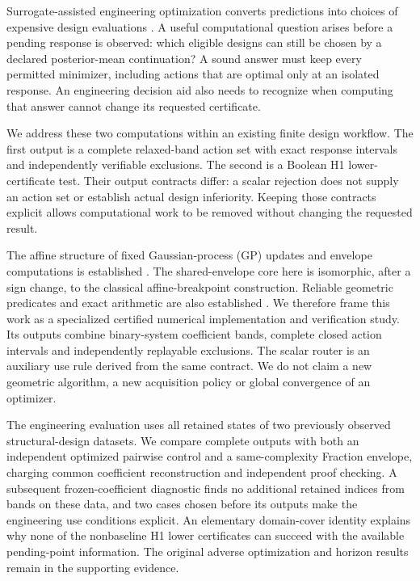 \documentclass[]{interact}
\begin{document}
Surrogate-assisted engineering optimization converts predictions into choices of expensive design evaluations \citep{ref01,ref02,ref03,ref35}. A useful computational question arises before a pending response is observed: which eligible designs can still be chosen by a declared posterior-mean continuation? A sound answer must keep every permitted minimizer, including actions that are optimal only at an isolated response. An engineering decision aid also needs to recognize when computing that answer cannot change its requested certificate.

We address these two computations within an existing finite design workflow. The first output is a complete relaxed-band action set with exact response intervals and independently verifiable exclusions. The second is a Boolean H1 lower-certificate test. Their output contracts differ: a scalar rejection does not supply an action set or establish actual design inferiority. Keeping those contracts explicit allows computational work to be removed without changing the requested result.

The affine structure of fixed Gaussian-process (GP) updates and envelope computations is established \citep{ref40,ref42}. The shared-envelope core here is isomorphic, after a sign change, to the classical affine-breakpoint construction. Reliable geometric predicates and exact arithmetic are also established \citep{ref41}. We therefore frame this work as a specialized certified numerical implementation and verification study. Its outputs combine binary-system coefficient bands, complete closed action intervals and independently replayable exclusions. The scalar router is an auxiliary use rule derived from the same contract. We do not claim a new geometric algorithm, a new acquisition policy or global convergence of an optimizer.

The engineering evaluation uses all retained states of two previously observed structural-design datasets. We compare complete outputs with both an independent optimized pairwise control and a same-complexity Fraction envelope, charging common coefficient reconstruction and independent proof checking. A subsequent frozen-coefficient diagnostic finds no additional retained indices from bands on these data, and two cases chosen before its outputs make the engineering use conditions explicit. An elementary domain-cover identity explains why none of the nonbaseline H1 lower certificates can succeed with the available pending-point information. The original adverse optimization and horizon results remain in the supporting evidence.
\end{document}
